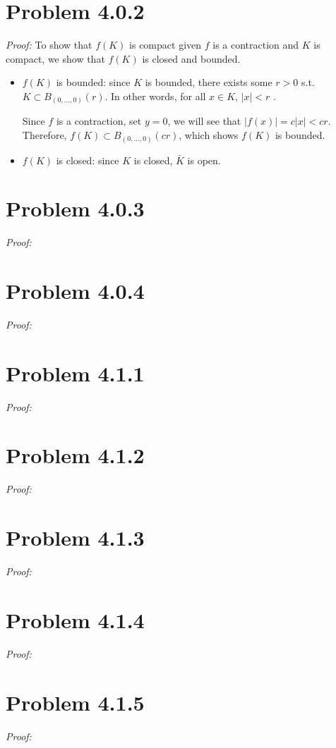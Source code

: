 \documentclass[11pt]{article}
\theoremstyle{definition}
\theoremstyle{remark}
\theoremstyle{problem}
\begin{document}
\section{Problem 4.0.2}
\textit{Proof:} To show that $f(K)$ is compact given $f$ is a contraction and $K$ is compact, we show that $f(K)$ is closed and bounded.

\begin{itemize}
    \item $f(K)$ is bounded: since $K$ is bounded, there exists some $r > 0$ s.t. $K \subset B_{(0, \ldots, 0)} (r)$. In other words, for all $x \in K$, $|x| < r$ .

   Since $f$ is a contraction, set $y = 0$, we will see that $|f(x)| = c|x| < cr$. Therefore, $f(K) \subset B_{(0, \ldots, 0)} (cr)$, which shows $f(K)$ is bounded.
   \item $f(K)$ is closed: since $K$ is closed, $\bar{K}$ is open.
\end{itemize}
\newpage

\section{Problem 4.0.3}
\textit{Proof:}
\newpage

\section{Problem 4.0.4}
\textit{Proof:}
\newpage

\section{Problem 4.1.1}
\textit{Proof:}
\newpage

\section{Problem 4.1.2}
\textit{Proof:}
\newpage

\section{Problem 4.1.3}
\textit{Proof:}
\newpage

\section{Problem 4.1.4}
\textit{Proof:}
\newpage

\section{Problem 4.1.5}
\textit{Proof:}
\newpage
\end{document}

